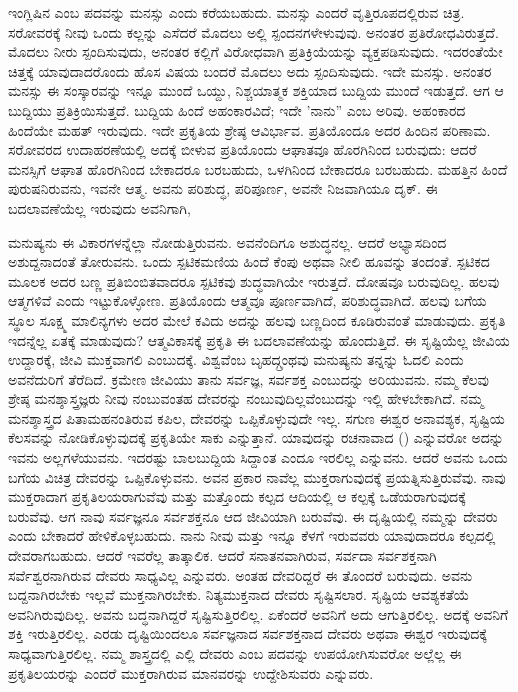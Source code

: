 ಇಂಗ್ಲಿಷಿನ  ಎಂಬ ಪದವನ್ನು ಮನಸ್ಸು ಎಂದು ಕರೆಯಬಹುದು. ಮನಸ್ಸು ಎಂದರೆ ವೃತ್ತಿರೂಪದಲ್ಲಿರುವ ಚಿತ್ರ. ಸರೋವರಕ್ಕೆ ನೀವು ಒಂದು ಕಲ್ಲನ್ನು ಎಸೆದರೆ ಮೊದಲು ಅಲ್ಲಿ ಸ್ಪಂದನಗಳೇಳುವುವು. ಅನಂತರ ಪ್ರತಿರೋಧವಿರುತ್ತದೆ. ಮೊದಲು ನೀರು ಸ್ಪಂದಿಸುವುದು, ಅನಂತರ ಕಲ್ಲಿಗೆ ವಿರೋಧವಾಗಿ ಪ್ರತಿಕ್ರಿಯೆಯನ್ನು ವ್ಯಕ್ತಪಡಿಸುವುದು. ಇದರಂತೆಯೇ ಚಿತ್ತಕ್ಕೆ ಯಾವುದಾದರೊಂದು ಹೊಸ ವಿಷಯ ಬಂದರೆ ಮೊದಲು ಅದು ಸ್ಪಂದಿಸುವುದು. ಇದೇ ಮನಸ್ಸು. ಅನಂತರ ಮನಸ್ಸು ಈ ಸಂಸ್ಕಾರವನ್ನು ಇನ್ನೂ ಮುಂದೆ ಒಯ್ದು, ನಿಶ್ಚಯಾತ್ಮಕ ಶಕ್ತಿಯಾದ ಬುದ್ದಿಯ ಮುಂದೆ ಇಡುತ್ತದೆ. ಆಗ ಆ ಬುದ್ದಿಯು ಪ್ರತಿಕ್ರಿಯಿಸುತ್ತದೆ. ಬುದ್ದಿಯ ಹಿಂದೆ ಅಹಂಕಾರವಿದೆ; ಇದೇ 'ನಾನು'' ಎಂಬ ಅರಿವು. ಅಹಂಕಾರದ ಹಿಂದೆಯೇ ಮಹತ್ ಇರುವುದು. ಇದೇ ಪ್ರಕೃತಿಯ ಶ್ರೇಷ್ಠ ಆವಿರ್ಭಾವ. ಪ್ರತಿಯೊಂದೂ ಅದರ ಹಿಂದಿನ ಪರಿಣಾಮ. ಸರೋವರದ ಉದಾಹರಣೆಯಲ್ಲಿ ಅದಕ್ಕೆ ಬೀಳುವ ಪ್ರತಿಯೊಂದು ಆಘಾತವೂ ಹೊರಗಿನಿಂದ ಬರುವುದು: ಆದರೆ ಮನಸ್ಸಿಗೆ ಆಘಾತ ಹೊರಗಿನಿಂದ ಬೇಕಾದರೂ ಬರಬಹುದು, ಒಳಗಿನಿಂದ ಬೇಕಾದರೂ ಬರಬಹುದು. ಮಹತ್ತಿನ ಹಿಂದೆ ಪುರುಷನಿರುವನು, ಇವನೇ ಆತ್ಮ. ಅವನು ಪರಿಶುದ್ಧ, ಪರಿಪೂರ್ಣ, ಅವನೇ ನಿಜವಾಗಿಯೂ ದೃಕ್. ಈ ಬದಲಾವಣೆಯೆಲ್ಲ ಇರುವುದು ಅವನಿಗಾಗಿ,

ಮನುಷ್ಯನು ಈ ವಿಕಾರಗಳನ್ನೆಲ್ಲಾ ನೋಡುತ್ತಿರುವನು. ಅವನೆಂದಿಗೂ ಅಶುದ್ಧನಲ್ಲ. ಆದರೆ ಅಭ್ಯಾಸದಿಂದ ಅಶುದ್ದನಾದಂತೆ ತೋರುವನು. ಒಂದು ಸ್ಪಟಿಕಮಣಿಯ ಹಿಂದೆ ಕೆಂಪು ಅಥವಾ ನೀಲಿ ಹೂವನ್ನು ತಂದಂತೆ. ಸ್ಪಟಿಕದ ಮೂಲಕ ಅದರ ಬಣ್ಣ ಪ್ರತಿಬಿಂಬಿತವಾದರೂ ಸ್ಪಟಿಕವು ಶುದ್ಧವಾಗಿಯೇ ಇರುತ್ತದೆ. ದೋಷವೂ ಬರುವುದಿಲ್ಲ. ಹಲವು ಆತ್ಮಗಳಿವೆ ಎಂದು ಇಟ್ಟುಕೊಳ್ಳೋಣ. ಪ್ರತಿಯೊಂದು ಆತ್ಮವೂ ಪೂರ್ಣವಾಗಿದೆ, ಪರಿಶುದ್ಧವಾಗಿದೆ. ಹಲವು ಬಗೆಯ ಸ್ಥೂಲ ಸೂಕ್ಷ್ಮ ಮಾಲಿನ್ಯಗಳು ಅದರ ಮೇಲೆ ಕವಿದು ಅದನ್ನು ಹಲವು ಬಣ್ಣದಿಂದ ಕೂಡಿರುವಂತೆ ಮಾಡುವುದು. ಪ್ರಕೃತಿ ಇದನ್ನೆಲ್ಲ ಏತಕ್ಕೆ ಮಾಡುವುದು? ಆತ್ಮವಿಕಾಸಕ್ಕೆ ಪ್ರಕೃತಿ ಈ ಬದಲಾವಣೆಯನ್ನು ಹೊಂದುತ್ತಿದೆ. ಈ ಸೃಷ್ಟಿಯೆಲ್ಲ ಜೀವಿಯ ಉದ್ದಾರಕ್ಕೆ, ಜೀವಿ ಮುಕ್ತವಾಗಲಿ ಎಂಬುದಕ್ಕೆ. ವಿಶ್ವವೆಂಬ ಬೃಹದ್ಗ್ರಂಥವು ಮನುಷ್ಯನು ತನ್ನನ್ನು ಓದಲಿ ಎಂದು ಅವನೆದುರಿಗೆ ತೆರೆದಿದೆ. ಕ್ರಮೇಣ ಜೀವಿಯು ತಾನು ಸರ್ವಜ್ಞ, ಸರ್ವಶಕ್ತ ಎಂಬುದನ್ನು ಅರಿಯುವನು. ನಮ್ಮ ಕೆಲವು ಶ್ರೇಷ್ಠ ಮನಶ್ಶಾಸ್ತ್ರಜ್ಞರು ನೀವು ನಂಬುವಂತಹ ದೇವರನ್ನು ನಂಬುವುದಿಲ್ಲವೆಂಬುದನ್ನು ಇಲ್ಲಿ ಹೇಳಬೇಕಾಗಿದೆ. ನಮ್ಮ ಮನಶ್ಶಾಸ್ತ್ರದ ಪಿತಾಮಹನಂತಿರುವ ಕಪಿಲ, ದೇವರನ್ನು ಒಪ್ಪಿಕೊಳ್ಳುವುದೇ ಇಲ್ಲ. ಸಗುಣ ಈಶ್ವರ ಅನಾವಶ್ಯಕ, ಸೃಷ್ಟಿಯ ಕೆಲಸವನ್ನು ನೋಡಿಕೊಳ್ಳುವುದಕ್ಕೆ ಪ್ರಕೃತಿಯೇ ಸಾಕು ಎನ್ನುತ್ತಾನೆ. ಯಾವುದನ್ನು ರಚನಾವಾದ () ಎನ್ನುವರೋ ಅದನ್ನು ಇವನು ಅಲ್ಲಗಳೆಯುವನು. ಇದರಷ್ಟು ಬಾಲಬುದ್ದಿಯ ಸಿದ್ದಾಂತ ಎಂದೂ ಇರಲಿಲ್ಲ ಎನ್ನುವನು. ಆದರೆ ಅವನು ಒಂದು ಬಗೆಯ ವಿಚಿತ್ರ ದೇವರನ್ನು ಒಪ್ಪಿಕೊಳ್ಳುವನು. ಅವನ ಪ್ರಕಾರ ನಾವೆಲ್ಲ ಮುಕ್ತರಾಗುವುದಕ್ಕೆ ಪ್ರಯತ್ನಿಸುತ್ತಿರುವೆವು. ನಾವು ಮುಕ್ತರಾದಾಗ ಪ್ರಕೃತಿಲಯರಾಗುವೆವು ಮತ್ತು ಮತ್ತೊಂದು ಕಲ್ಪದ ಆದಿಯಲ್ಲಿ ಆ ಕಲ್ಪಕ್ಕೆ ಒಡೆಯರಾಗುವುದಕ್ಕೆ ಬರುವೆವು. ಆಗ ನಾವು ಸರ್ವಜ್ಞನೂ ಸರ್ವಶಕ್ತನೂ ಆದ ಜೀವಿಯಾಗಿ ಬರುವೆವು. ಈ ದೃಷ್ಟಿಯಲ್ಲಿ ನಮ್ಮನ್ನು ದೇವರು ಎಂದು ಬೇಕಾದರೆ ಹೇಳಿಕೊಳ್ಳಬಹುದು. ನಾನು ನೀವು ಮತ್ತು ಇನ್ನೂ ಕೆಳಗೆ ಇರುವವರು ಯಾವುದಾದರೂ ಕಲ್ಪದಲ್ಲಿ ದೇವರಾಗಬಹುದು. ಆದರೆ ಇವರೆಲ್ಲ ತಾತ್ಕಾಲಿಕ. ಆದರೆ ಸನಾತನವಾಗಿರುವ, ಸರ್ವದಾ ಸರ್ವಶಕ್ತನಾಗಿ ಸರ್ವೆಶ್ವರನಾಗಿರುವ ದೇವರು ಸಾಧ್ಯವಿಲ್ಲ ಎನ್ನುವರು. ಅಂತಹ ದೇವರಿದ್ದರೆ ಈ ತೊಂದರೆ ಬರುವುದು. ಅವನು ಬದ್ದನಾಗಿರಬೇಕು ಇಲ್ಲವೆ ಮುಕ್ತನಾಗಿರಬೇಕು. ನಿತ್ಯಮುಕ್ತನಾದ ದೇವರು ಸೃಷ್ಟಿಸಲಾರ. ಸೃಷ್ಟಿಯ ಆವಶ್ಯಕತೆಯೆ ಅವನಿಗಿರುವುದಿಲ್ಲ. ಅವನು ಬದ್ಧನಾಗಿದ್ದರೆ ಸೃಷ್ಟಿಸುತ್ತಿರಲಿಲ್ಲ. ಏಕೆಂದರೆ ಅವನಿಗೆ ಅದು ಆಗುತ್ತಿರಲಿಲ್ಲ. ಅದಕ್ಕೆ ಅವನಿಗೆ ಶಕ್ತಿ ಇರುತ್ತಿರಲಿಲ್ಲ. ಎರಡು ದೃಷ್ಟಿಯಿಂದಲೂ ಸರ್ವಜ್ಞನಾದ ಸರ್ವಶಕ್ತನಾದ ದೇವರು ಅಥವಾ ಈಶ್ವರ ಇರುವುದಕ್ಕೆ ಸಾಧ್ಯವಾಗುತ್ತಿರಲಿಲ್ಲ. ನಮ್ಮ ಶಾಸ್ತ್ರದಲ್ಲಿ ಎಲ್ಲಿ ದೇವರು ಎಂಬ ಪದವನ್ನು ಉಪಯೋಗಿಸುವರೋ ಅಲ್ಲೆಲ್ಲ ಈ ಪ್ರಕೃತಿಲಯರನ್ನು ಎಂದರೆ ಮುಕ್ತರಾಗಿರುವ ಮಾನವರನ್ನು ಉದ್ದೇಶಿಸುವರು ಎನ್ನುವರು.


